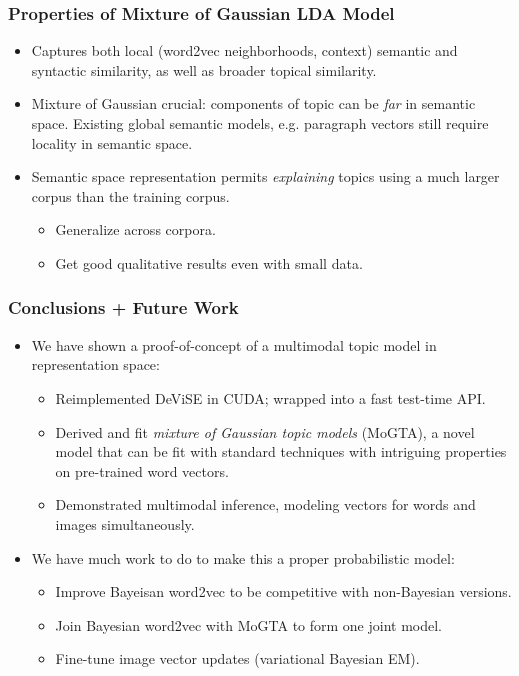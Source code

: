 \documentclass{beamer}
\begin{document}
\begin{frame}
  \frametitle{Properties of Mixture of Gaussian LDA Model}
  \begin{itemize}
    \item Captures both local (word2vec neighborhoods, context) semantic and syntactic similarity, as well as broader topical similarity.
    \item Mixture of Gaussian crucial: components of topic can be \emph{far} in semantic space. Existing global semantic models, e.g. paragraph vectors \citep{Le14q} still require locality in semantic space.
    \item Semantic space representation permits \emph{explaining} topics using a much larger corpus than the training corpus.
    \begin{itemize}
      \item Generalize across corpora.
      \item Get good qualitative results even with small data.
    \end{itemize}
        
  \end{itemize}

\end{frame}

\begin{frame}
  \frametitle{Conclusions + Future Work}
  \begin{itemize}
    \item We have shown a proof-of-concept of a multimodal topic model in representation space:
    \begin{itemize}
      \item Reimplemented DeViSE in CUDA; wrapped into a fast test-time API.
      \item Derived and fit \emph{mixture of Gaussian topic models} (MoGTA), a novel model that can be fit with standard techniques with intriguing properties on pre-trained word vectors.
      \item Demonstrated multimodal inference, modeling vectors for words and images simultaneously.
    \end{itemize}
    \item We have much work to do to make this a proper probabilistic model:
    \begin{itemize}
      \item Improve Bayeisan word2vec to be competitive with non-Bayesian versions.
      \item Join Bayesian word2vec with MoGTA to form one joint model.
      \item Fine-tune image vector updates (variational Bayesian EM).
    \end{itemize}
  \end{itemize}
\end{frame}
\end{document}
